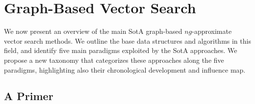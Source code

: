 \section{Graph-Based Vector Search}
\label{sec:survey}
We now present an overview of the main SotA graph-based $ng$-approximate vector search methods. 
We outline the base data structures and algorithms in this field, and identify five main paradigms exploited by the SotA approaches. %
We propose a new taxonomy that categorizes these approaches along the five paradigms, highlighting also their chronological development and influence map. 

\subsection{A Primer}

